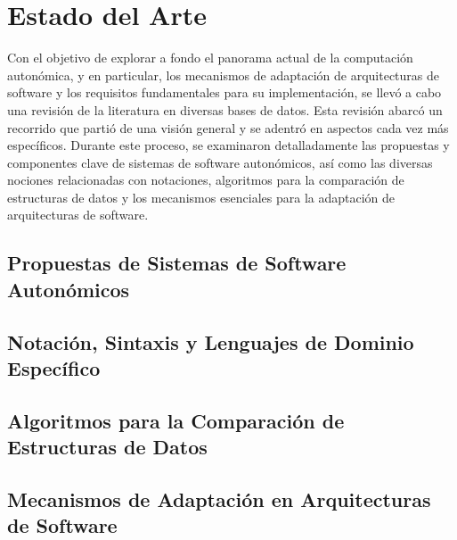 \section{Estado del Arte}

Con el objetivo de explorar a fondo el panorama actual de la computación autonómica, y en particular, los mecanismos de adaptación de arquitecturas de software y los requisitos fundamentales para su implementación, se llevó a cabo una revisión de la literatura en diversas bases de datos. Esta revisión abarcó un recorrido que partió de una visión general y se adentró en aspectos cada vez más específicos. Durante este proceso, se examinaron detalladamente las propuestas y componentes clave de sistemas de software autonómicos, así como las diversas nociones relacionadas con notaciones, algoritmos para la comparación de estructuras de datos y los mecanismos esenciales para la adaptación de arquitecturas de software. 

\subsection{Propuestas de Sistemas de Software Autonómicos}




\subsection{Notación, Sintaxis y Lenguajes de Dominio Específico}


\subsection{Algoritmos para la Comparación de Estructuras de Datos}


\subsection{Mecanismos de Adaptación en Arquitecturas de Software}